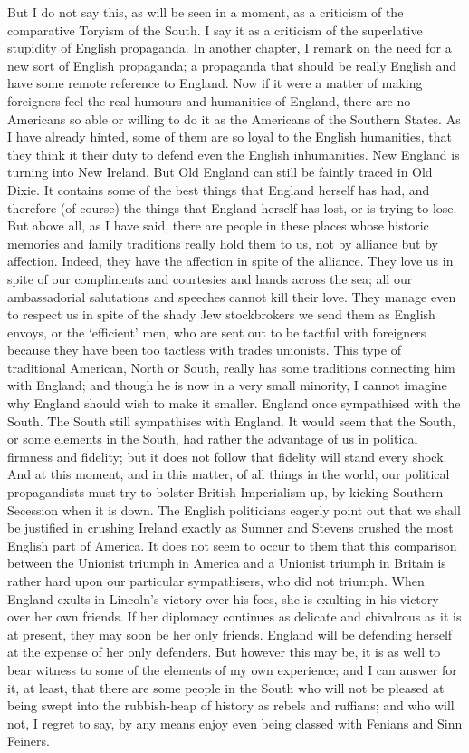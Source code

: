 \documentclass{book}
\begin{document}
But I do not say this, as will be seen in a moment, as a criticism of the comparative Toryism of the South. I say it as a criticism of the superlative stupidity of English propaganda. In another chapter, I remark on the need for a new sort of English propaganda; a propaganda that should be really English and have some remote reference to England. Now if it were a matter of making foreigners feel the real humours and humanities of England, there are no Americans so able or willing to do it as the Americans of the Southern States. As I have already hinted, some of them are so loyal to the English humanities, that they think it their duty to defend even the English inhumanities. New England is turning into New Ireland. But Old England can still be faintly traced in Old Dixie. It contains some of the best things that England herself has had, and therefore (of course) the things that England herself has lost, or is trying to lose. But above all, as I have said, there are people in these places whose historic memories and family traditions really hold them to us, not by alliance but by affection. Indeed, they have the affection in spite of the alliance. They love us in spite of our compliments and courtesies and hands across the sea; all our ambassadorial salutations and speeches cannot kill their love. They manage even to respect us in spite of the shady Jew stockbrokers we send them as English envoys, or the ‘efficient’ men, who are sent out to be tactful with foreigners because they have been too tactless with trades unionists. This type of traditional American, North or South, really has some traditions connecting him with England; and though he is now in a very small minority, I cannot imagine why England should wish to make it smaller. England once sympathised with the South. The South still sympathises with England. It would seem that the South, or some elements in the South, had rather the advantage of us in political firmness and fidelity; but it does not follow that fidelity will stand every shock. And at this moment, and in this matter, of all things in the world, our political propagandists must try to bolster British Imperialism up, by kicking Southern Secession when it is down. The English politicians eagerly point out that we shall be justified in crushing Ireland exactly as Sumner and Stevens crushed the most English part of America. It does not seem to occur to them that this comparison between the Unionist triumph in America and a Unionist triumph in Britain is rather hard upon our particular sympathisers, who did not triumph. When England exults in Lincoln’s victory over his foes, she is exulting in his victory over her own friends. If her diplomacy continues as delicate and chivalrous as it is at present, they may soon be her only friends. England will be defending herself at the expense of her only defenders. But however this may be, it is as well to bear witness to some of the elements of my own experience; and I can answer for it, at least, that there are some people in the South who will not be pleased at being swept into the rubbish-heap of history as rebels and ruffians; and who will not, I regret to say, by any means enjoy even being classed with Fenians and Sinn Feiners.
\end{document}
